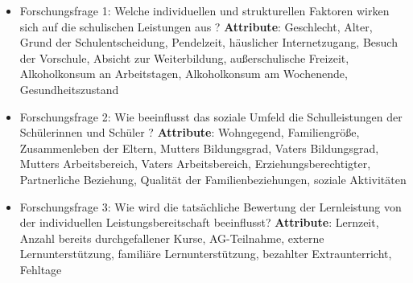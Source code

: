 \begin{itemize}
    \item Forschungsfrage 1: Welche individuellen und strukturellen Faktoren wirken sich auf die schulischen Leistungen aus ?
        \subitem \textbf{Attribute}: Geschlecht, Alter, Grund der Schulentscheidung, Pendelzeit, häuslicher Internetzugang, Besuch der Vorschule, Absicht zur Weiterbildung, außerschulische Freizeit, Alkoholkonsum an Arbeitstagen, Alkoholkonsum am Wochenende, Gesundheitszustand
    \item Forschungsfrage 2: Wie beeinflusst das soziale Umfeld die Schulleistungen der Schülerinnen und Schüler ? 
        \subitem \textbf{Attribute}: Wohngegend, Familiengröße, Zusammenleben der Eltern, Mutters Bildungsgrad, Vaters Bildungsgrad, Mutters Arbeitsbereich, Vaters Arbeitsbereich, Erziehungsberechtigter, Partnerliche Beziehung, Qualität der Familienbeziehungen, soziale Aktivitäten
    \item Forschungsfrage 3: Wie wird die tatsächliche Bewertung der Lernleistung von der individuellen Leistungsbereitschaft beeinflusst?
        \subitem \textbf{Attribute}: Lernzeit, Anzahl bereits durchgefallener Kurse, AG-Teilnahme, externe Lernunterstützung, familiäre Lernunterstützung, bezahlter Extraunterricht, Fehltage
\end{itemize}




